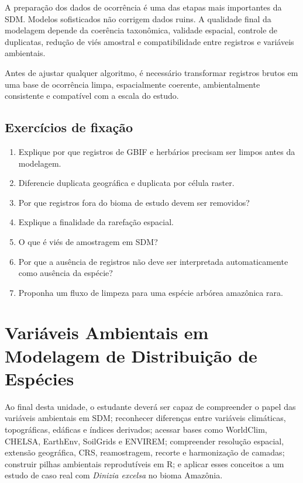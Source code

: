 \documentclass{ueap-sdm}
\begin{document}
A preparação dos dados de ocorrência é uma das etapas mais importantes da SDM. Modelos sofisticados não corrigem dados ruins. A qualidade final da modelagem depende da coerência taxonômica, validade espacial, controle de duplicatas, redução de viés amostral e compatibilidade entre registros e variáveis ambientais.

\begin{conceito}[title={\faBook\quad Mensagem central}]
	Antes de ajustar qualquer algoritmo, é necessário transformar registros brutos em uma base de ocorrência limpa, espacialmente coerente, ambientalmente consistente e compatível com a escala do estudo.
\end{conceito}

\section{Exercícios de fixação}

\begin{enumerate}
	\item Explique por que registros de GBIF e herbários precisam ser limpos antes da modelagem.
	\item Diferencie duplicata geográfica e duplicata por célula raster.
	\item Por que registros fora do bioma de estudo devem ser removidos?
	\item Explique a finalidade da rarefação espacial.
	\item O que é viés de amostragem em SDM?
	\item Por que a ausência de registros não deve ser interpretada automaticamente como ausência da espécie?
	\item Proponha um fluxo de limpeza para uma espécie arbórea amazônica rara.
\end{enumerate}


\chapter[Variáveis ambientais]{Variáveis Ambientais em Modelagem de Distribuição de Espécies}

\begin{objetivos}
	Ao final desta unidade, o estudante deverá ser capaz de compreender o papel das variáveis ambientais em SDM; reconhecer diferenças entre variáveis climáticas, topográficas, edáficas e índices derivados; acessar bases como WorldClim, CHELSA, EarthEnv, SoilGrids e ENVIREM; compreender resolução espacial, extensão geográfica, CRS, reamostragem, recorte e harmonização de camadas; construir pilhas ambientais reprodutíveis em R; e aplicar esses conceitos a um estudo de caso real com \textit{Dinizia excelsa} no bioma Amazônia.
\end{objetivos}
\end{document}
